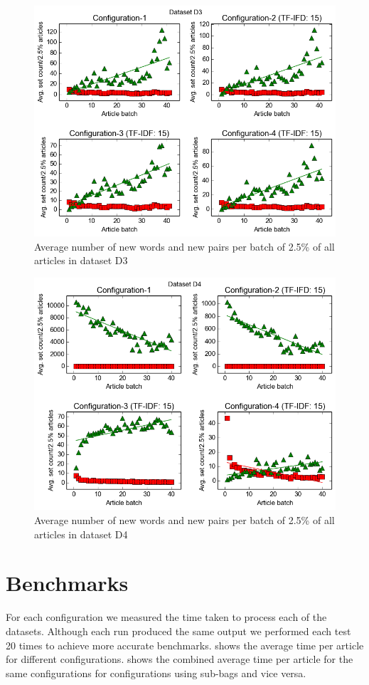 \begin{figure}[ht]
  \centering
  \includegraphics[scale=0.70]{images/D3-plot.png}
  \caption{Average number of new words and new pairs per batch of 2.5\% of all articles in dataset D3}
  \label{fig:setPlot3}
\end{figure}

\begin{figure}[ht]
  \centering
  \includegraphics[scale=0.70]{images/D4-plot.png}
  \caption{Average number of new words and new pairs per batch of 2.5\% of all articles in dataset D4}
  \label{fig:setPlot4}
\end{figure}

\section{Benchmarks}
For each configuration we measured the time taken to process each of the datasets. Although each run produced the same output we performed each test 20 times to achieve more accurate benchmarks.  shows the average time per article for different configurations.  shows the combined average time per article for the same configurations for configurations using sub-bags and vice versa.

